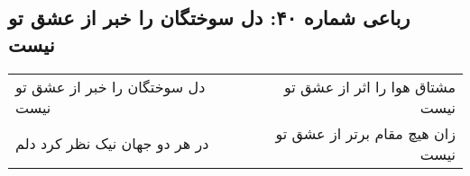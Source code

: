 \begin{center}
\section*{رباعی شماره ۴۰: دل سوختگان را خبر از عشق تو نیست}
\label{sec:040}
\begin{longtable}{l p{0.5cm} r}
دل سوختگان را خبر از عشق تو نیست
&&
مشتاق هوا را اثر از عشق تو نیست
\\
در هر دو جهان نیک نظر کرد دلم
&&
زان هیچ مقام برتر از عشق تو نیست
\\
\end{longtable}
\end{center}
